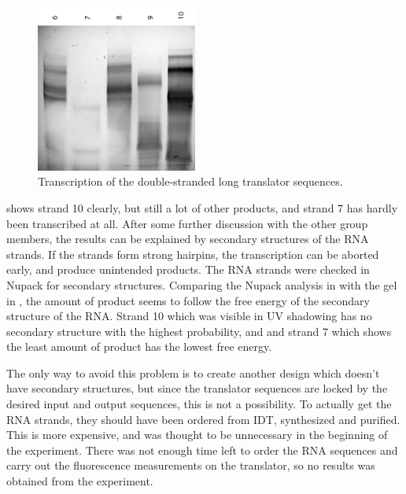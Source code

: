 \begin{figure}[H]
\centering
\includegraphics[width=150pt]{images/translator_transcription_long_ds_1.png}
\caption{Transcription of the double-stranded long translator sequences.}
\label{translator_transcription_long_ds_1}
\end{figure}

 shows strand 10 clearly, but still a lot of other products, and strand 7 has hardly been transcribed at all. After some further discussion with the other group members, the results can be explained by secondary structures of the RNA strands. If the strands form strong hairpins, the transcription can be aborted early, and produce unintended products. The RNA strands were checked in Nupack for secondary structures. Comparing the Nupack analysis in  with the gel in , the amount of product seems to follow the free energy of the secondary structure of the RNA. Strand 10 which was visible in UV shadowing has no secondary structure with the highest probability, and and strand 7 which shows the least amount of product has the lowest free energy.

The only way to avoid this problem is to create another design which doesn't have secondary structures, but since the translator sequences are locked by the desired input and output sequences, this is not a possibility. To actually get the RNA strands, they should have been ordered from IDT, synthesized and purified. This is more expensive, and was thought to be unnecessary in the beginning of the experiment. There was not enough time left to order the RNA sequences and carry out the fluorescence measurements on the translator, so no results was obtained from the experiment.

